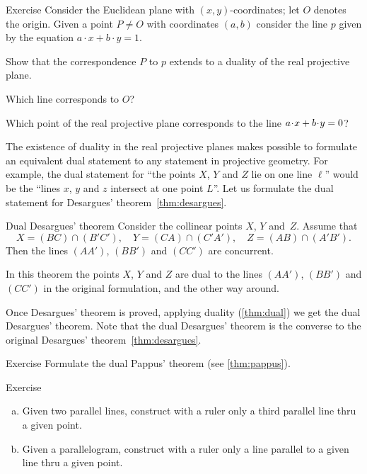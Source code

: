 \begin{thm}{Exercise}\label{ex:dula-coordinates}
Consider the Euclidean plane with $(x,y)$-coordinates; let $O$ denotes the origin.
Given a point $P\ne O$ with coordinates $(a,b)$ consider the line $p$ 
given by the equation 
$a\cdot x+b\cdot y=1$.

Show that the correspondence $P$ to $p$ extends to a duality of the real projective plane.

Which line corresponds to $O$?

Which point of the real projective plane corresponds to the line  $a\cdot x\z+b\cdot y=0$?
\end{thm}

The existence of duality in the real projective planes makes possible to formulate an equivalent dual statement to any statement in projective geometry.
For example, the dual statement for ``the points $X$, $Y$ and $Z$ lie on one line $\ell$''
would be the ``lines $x$, $y$ and $z$ intersect at one point $L$''.
Let us formulate the dual statement for Desargues' theorem~\ref{thm:desargues}.


\begin{thm}{Dual Desargues' theorem}\label{thm:dual-desargues}
Consider the collinear points $X$, $Y$ and~$Z$.
Assume that 
\[X=(BC)\cap (B'C'),\quad Y=(CA)\cap (C'A'),\quad Z=(AB)\cap (A'B').\]
Then the lines  $(AA')$, $(BB')$ and $(CC')$ are concurrent.
\end{thm}

In this theorem the points $X$, $Y$ and $Z$ 
are dual to the lines $(AA')$, $(BB')$ and $(CC')$ in the original formulation, and the other way around.

Once Desargues' theorem is proved, applying duality (\ref{thm:dual})
we get the dual Desargues' theorem.
Note that the dual Desargues' theorem is the converse to the original Desargues' theorem~\ref{thm:desargues}.

\begin{thm}{Exercise}\label{ex:dual-pappus}
Formulate the dual Pappus' theorem (see \ref{thm:pappus}).
\end{thm}

\begin{thm}{Exercise}\label{ex:dual-desargues-construction}
\begin{enumerate}[(a)]
\item\label{ex:dual-desargues-construction:a}
Given two parallel lines, construct with a ruler only a third parallel line thru a given point.
\item \label{ex:dual-desargues-construction:b}
Given a parallelogram, construct with a ruler only a line parallel to a given line thru a given point.
\end{enumerate}

\end{thm}

